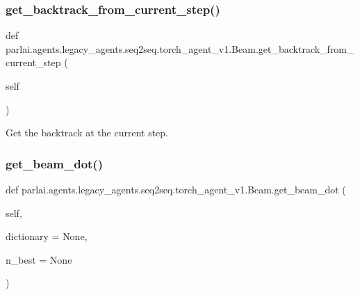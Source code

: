 \subsubsection{\texorpdfstring{get\+\_\+backtrack\+\_\+from\+\_\+current\+\_\+step()}{get\_backtrack\_from\_current\_step()}}
{\footnotesize\ttfamily def parlai.\+agents.\+legacy\+\_\+agents.\+seq2seq.\+torch\+\_\+agent\+\_\+v1.\+Beam.\+get\+\_\+backtrack\+\_\+from\+\_\+current\+\_\+step (\begin{DoxyParamCaption}\item[{}]{self }\end{DoxyParamCaption})}

\begin{DoxyVerb}Get the backtrack at the current step.
\end{DoxyVerb}
 \mbox{\label{classparlai_1_1agents_1_1legacy__agents_1_1seq2seq_1_1torch__agent__v1_1_1Beam_af4d7c9fd1fd93f59148fe7ab90c58da9}} 
\subsubsection{\texorpdfstring{get\+\_\+beam\+\_\+dot()}{get\_beam\_dot()}}
{\footnotesize\ttfamily def parlai.\+agents.\+legacy\+\_\+agents.\+seq2seq.\+torch\+\_\+agent\+\_\+v1.\+Beam.\+get\+\_\+beam\+\_\+dot (\begin{DoxyParamCaption}\item[{}]{self,  }\item[{}]{dictionary = {\ttfamily None},  }\item[{}]{n\+\_\+best = {\ttfamily None} }\end{DoxyParamCaption})}


